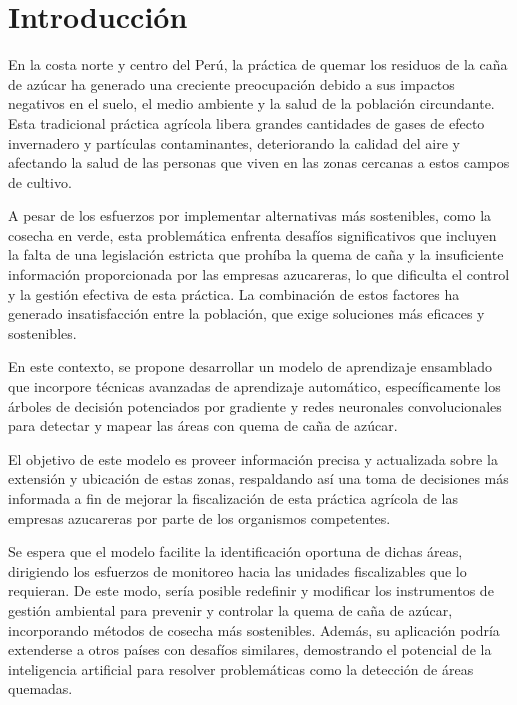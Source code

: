 \section{Introducción}
En la costa norte y centro del Perú, la práctica de quemar los residuos de la caña de azúcar ha generado una creciente preocupación debido a sus impactos negativos en el suelo, el medio ambiente y la salud 
de la población circundante. Esta tradicional práctica agrícola libera grandes cantidades de gases de efecto invernadero y partículas contaminantes, deteriorando la calidad del aire y afectando la salud de 
las personas que viven en las zonas cercanas a estos campos de cultivo.

A pesar de los esfuerzos por implementar alternativas más sostenibles, como la cosecha en verde, esta problemática enfrenta desafíos significativos que incluyen la falta de una legislación 
estricta que prohíba la quema de caña y la insuficiente información proporcionada por las empresas azucareras, lo que dificulta el control y la gestión efectiva de esta práctica. La combinación de estos factores 
ha generado insatisfacción entre la población, que exige soluciones más eficaces y sostenibles.

En este contexto, se propone desarrollar un modelo de aprendizaje ensamblado que incorpore técnicas avanzadas de aprendizaje automático, específicamente los árboles de decisión potenciados por gradiente y redes 
neuronales convolucionales para detectar y mapear las áreas con quema de caña de azúcar. 

El objetivo de este modelo es proveer información precisa y actualizada sobre la extensión y ubicación de estas zonas, respaldando así una toma de decisiones más informada a fin de mejorar la fiscalización
de esta práctica agrícola de las empresas azucareras por parte de los organismos competentes.

Se espera que el modelo facilite la identificación oportuna de dichas áreas, dirigiendo los esfuerzos de monitoreo hacia las unidades fiscalizables que lo requieran. De este modo, sería posible redefinir y modificar 
los instrumentos de gestión ambiental para prevenir y controlar la quema de caña de azúcar, incorporando métodos de cosecha más sostenibles. Además, su aplicación podría extenderse a otros países con desafíos similares, 
demostrando el potencial de la inteligencia artificial para resolver problemáticas como la detección de áreas quemadas.

